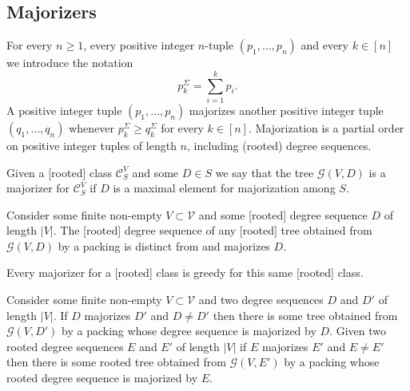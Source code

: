 \documentclass[11 pt]{modarticle}
\newcommand{\vset}{\mathcal{V}}
\newcommand{\size}[1]{|#1|}
\newcommand{\tclass}{\mathcal{C}}
\newcommand{\greedy}[2]{\mathcal{G}(#1,#2)}
\newcommand{\pclass}[2]{\tclass^{#1}_{#2}}
\begin{document}
\subsection{Majorizers}\label{section:majorization}

For every $n \geq 1$, every positive integer $n$-tuple $(p_1, \dots, p_n)$ and every $k \in [n]$ we introduce the notation
\begin{equation*}
	p^{\Sigma}_k = \underset{i=1}{\overset{k}{\sum}} p_i.
\end{equation*}
A positive integer tuple $(p_1, \dots, p_n)$ majorizes another positive integer tuple $(q_1, \dots, q_n)$ whenever $p^{\Sigma}_k \geq q^{\Sigma}_k$ for every $k \in [n]$. Majorization is a partial order on positive integer tuples of length $n$, including (rooted) degree sequences.%


\begin{defi}
Given a [rooted] class $\pclass{V}{S}$ and some $D \in S$ we say that the tree $\greedy{V}{D}$ is a majorizer for $\pclass{V}{S}$ if $D$ is a maximal element for majorization among $S$.
\end{defi}

\begin{rem}\label{rem:majorization}
Consider some finite non-empty $V \subset \vset$ and some [rooted] degree sequence $D$ of length $\size{V}$. The [rooted] degree sequence of any [rooted] tree obtained from $\greedy{V}{D}$ by a packing is distinct from and majorizes $D$.
\end{rem}

\begin{cor}\label{cor:majorization}
Every majorizer for a [rooted] class is greedy for this same [rooted] class.
\end{cor}

\begin{prop}\label{prop:majorization}
Consider some finite non-empty $V \subset \vset$ and two degree sequences $D$ and $D'$ of length $\size{V}$. If $D$ majorizes $D'$ and $D \neq D'$ then there is some tree obtained from $\greedy{V}{D'}$ by a packing whose degree sequence is majorized by $D$. Given two rooted degree sequences $E$ and $E'$ of length $\size{V}$ if $E$ majorizes $E'$ and $E \neq E'$ then there is some rooted tree obtained from $\greedy{V}{E'}$ by a packing whose rooted degree sequence is majorized by $E$.
\end{prop}
\end{document}
